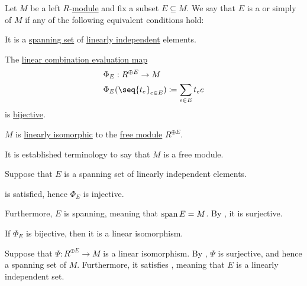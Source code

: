 \begin{definition}\label{def:hamel_basis}\mimprovised
  Let \( M \) be a left \( R \)-\hyperref[def:module]{module} and fix a subset \( E \subseteq M \). We say that \( E \) is a  or simply  of \( M \) if any of the following equivalent conditions hold:

  \begin{thmenum}
     It is a \hyperref[thm:span_via_linear_combinations]{spanning set} of \hyperref[def:linear_dependence]{linearly independent} elements.

     The \hyperref[thm:free_semimodule_universal_property]{linear combination evaluation map}
    \begin{equation*}
      \begin{aligned}
        &\Phi_E: R^{\oplus E} \to M \\
        &\Phi_E( \seq{ t_e }_{e \in E} ) \coloneqq \sum_{e \in E} t_e e
      \end{aligned}
    \end{equation*}
    is \hyperref[def:function_invertibility/bijective]{bijective}.

     \( M \) is \hyperref[def:semimodule/homomorphism]{linearly isomorphic} to the \hyperref[def:free_semimodule]{free module} \( R^{\oplus E} \).

    It is established terminology to say that \( M \) is a free module.
  \end{thmenum}
\end{definition}
\begin{defproof}
   Suppose that \( E \) is a spanning set of linearly independent elements.

   is satisfied, hence \( \Phi_E \) is injective.

  Furthermore, \( E \) is spanning, meaning that \( \operatorname{span} E = M \). By , it is surjective.

   If \( \Phi_E \) is bijective, then it is a linear isomorphism.

   Suppose that \( \Psi: R^{\oplus E} \to M \) is a linear isomorphism. By , \( \Psi \) is surjective, and hence a spanning set of \( M \). Furthermore, it satisfies , meaning that \( E \) is a linearly independent set.
\end{defproof}

